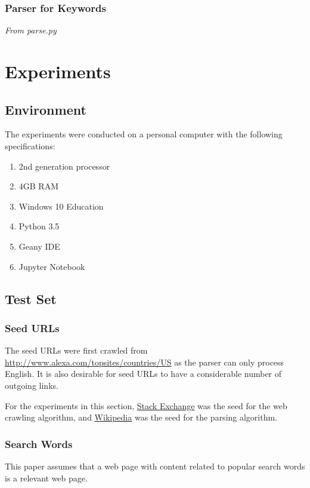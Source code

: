 \documentclass{article}
\begin{document}
\subsubsection{Parser for Keywords}
\textit{From parse.py}

\newpage

\section{Experiments}

\subsection{Environment}
The experiments were conducted on a personal computer with the following specifications:
\begin{enumerate}
	\item 2nd generation processor
	\item 4GB RAM
	\item Windows 10 Education
	\item Python 3.5
	\item Geany IDE
	\item Jupyter Notebook
\end{enumerate}

\subsection{Test Set}

\subsubsection{Seed URLs}
The seed URLs were first crawled from \url{http://www.alexa.com/topsites/countries/US} as the parser can only process English. It is also desirable for seed URLs to have a considerable number of outgoing links.
\medskip

For the experiments in this section, \href{http://stackexchange.com/}{Stack Exchange} was the seed for the web crawling algorithm, and \href{https://en.wikipedia.org/wiki/Main_Page}{Wikipedia} was the seed for the parsing algorithm.

\subsubsection{Search Words}
This paper assumes that a web page with content related to popular search words is a relevant web page.
\medskip
\end{document}
